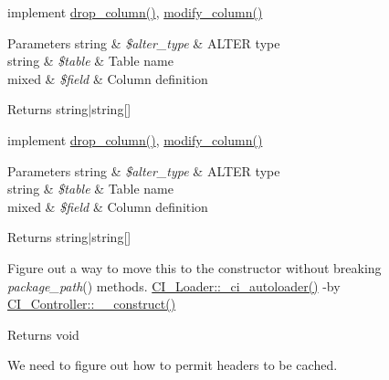 \begin{DoxyRefList}
\item[\label{todo__todo000008}%
\hypertarget{todo__todo000008}{}%
Global \hyperlink{class_c_i___d_b__sqlite3__forge_a41c6cae02f2fda8b429ad0afb9509426}{C\+I\+\_\+\+D\+B\+\_\+sqlite3\+\_\+forge\+:\+:\+\_\+alter\+\_\+table} (\$alter\+\_\+type, \$table, \$field)]implement \hyperlink{class_c_i___d_b__forge_aed0d6a0b12511dbdf19bb68fed7fd467}{drop\+\_\+column()}, \hyperlink{class_c_i___d_b__forge_aa03cc8de0ac9ce03016bd2b50ddeff87}{modify\+\_\+column()} 
\begin{DoxyParams}[1]{Parameters}
string & {\em \$alter\+\_\+type} & A\+L\+T\+E\+R type \\
\hline
string & {\em \$table} & Table name \\
\hline
mixed & {\em \$field} & Column definition \\
\hline
\end{DoxyParams}
\begin{DoxyReturn}{Returns}
string$\vert$string\mbox{[}\mbox{]}  
\end{DoxyReturn}

\item[\label{todo__todo000006}%
\hypertarget{todo__todo000006}{}%
Global \hyperlink{class_c_i___d_b__sqlite__forge_a41c6cae02f2fda8b429ad0afb9509426}{C\+I\+\_\+\+D\+B\+\_\+sqlite\+\_\+forge\+:\+:\+\_\+alter\+\_\+table} (\$alter\+\_\+type, \$table, \$field)]implement \hyperlink{class_c_i___d_b__forge_aed0d6a0b12511dbdf19bb68fed7fd467}{drop\+\_\+column()}, \hyperlink{class_c_i___d_b__forge_aa03cc8de0ac9ce03016bd2b50ddeff87}{modify\+\_\+column()} 
\begin{DoxyParams}[1]{Parameters}
string & {\em \$alter\+\_\+type} & A\+L\+T\+E\+R type \\
\hline
string & {\em \$table} & Table name \\
\hline
mixed & {\em \$field} & Column definition \\
\hline
\end{DoxyParams}
\begin{DoxyReturn}{Returns}
string$\vert$string\mbox{[}\mbox{]}  
\end{DoxyReturn}

\item[\label{todo__todo000001}%
\hypertarget{todo__todo000001}{}%
Global \hyperlink{class_c_i___loader_a91098fa7d1917ce4833f284bbef12627}{C\+I\+\_\+\+Loader\+:\+:initialize} ()]Figure out a way to move this to the constructor without breaking {\itshape package\+\_\+path}() methods.  \hyperlink{class_c_i___loader_a93471c04ea0689dcf8faa5903d201efe}{C\+I\+\_\+\+Loader\+::\+\_\+ci\+\_\+autoloader()} -\/by \hyperlink{class_c_i___controller_a095c5d389db211932136b53f25f39685}{C\+I\+\_\+\+Controller\+::\+\_\+\+\_\+construct()} \begin{DoxyReturn}{Returns}
void  
\end{DoxyReturn}

\item[\label{todo__todo000002}%
\hypertarget{todo__todo000002}{}%
Global \hyperlink{class_c_i___output_a270389a1636faa81eda5ef3fa900ea25}{C\+I\+\_\+\+Output\+:\+:set\+\_\+header} (\$header, \$replace=T\+R\+U\+E)]We need to figure out how to permit headers to be cached.
\end{DoxyRefList}